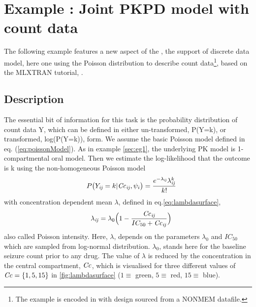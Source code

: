 
\newpage

\section{Example \theexamples: Joint PKPD model with count data}
\label{sec:eg6}
The following example features a new aspect of the \pml, the support of discrete 
data model, here one using the Poisson distribution to describe count data\footnote{The 
example is encoded in  with design sourced 
from a NONMEM datafile.}, based on the MLXTRAN tutorial, 
\cite{Monolix4.3Tutorial:2014}.
\subsection{Description}
\label{subsec:exp6_intro} 
The essential bit of information for this task is the probability distribution of count 
data Y, which can be defined in either un-transformed, P(Y=k), or transformed, 
log(P(Y=k)), form. 
We assume the basic Poisson model defined in eq. (\ref{eq:poissonModel}). 
As in example \ref{sec:eg1}, the underlying PK model is 1-compartmental oral model. 
Then we estimate the log-likelihood that the outcome is k using the non-homogeneous 
Poisson model 
\begin{eqnarray}
&& P\big(Y_{\mathit{ij}}=k | \mathit{Cc}_{\mathit{ij}}, \psi_i\big) =  \frac{e^{-\lambda_{\mathit{ij}}} \lambda^k_{\mathit{ij}}}{k!} \label{eq:poissonModel}
\end{eqnarray}
with concentration dependent mean $\lambda$, defined in eq.\ref{eq:lambdasurface},
\begin{eqnarray}
&& \lambda_{\mathit{ij}} = \lambda_0 \Big(1 - \frac{\mathit{Cc}_{\mathit{ij}}}{IC_{50} + \mathit{Cc}_{\mathit{ij}}}\Big)  \label{eq:lambdasurface}
\end{eqnarray}
also called Poisson intensity. Here, $\lambda$, depends on the parameters 
$\lambda_0$ and $IC_{50}$ which are sampled from log-normal distribution. 
$\lambda_0$, stands here for the baseline seizure count prior to any drug. 
The value of $\lambda$ is reduced by the concentration in the central 
compartment, $\mathit{Cc}$, which is visualised for three different values 
of $\mathit{Cc} = \{1,5,15\}$ in \ref{fig:lambdasurface} ($1\equiv$ green, $5 \equiv$ 
red, $15 \equiv$ blue).

